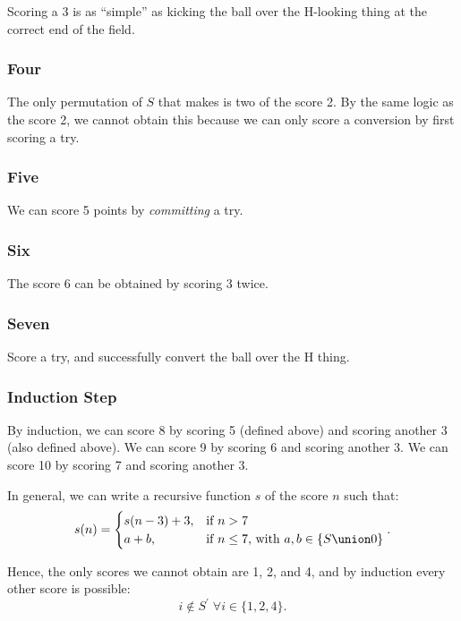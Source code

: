 \documentclass{arteacle}
\begin{document}
Scoring a 3 is as ``simple'' as kicking the ball over the H-looking thing at the correct end of the field.

\subsubsection*{Four}

The only permutation of $S$ that makes is two of the score 2.  By the same logic as the score 2, we cannot obtain this because we can only score a conversion by first scoring a try.

\subsubsection*{Five}

We can score 5 points by \emph{committing} a try.

\subsubsection*{Six}

The score 6 can be obtained by scoring 3 twice.

\subsubsection*{Seven}

Score a try, and successfully convert the ball over the H thing.

\subsubsection*{Induction Step}

By induction, we can score 8 by scoring 5 (defined above) and scoring another 3 (also defined above).  We can score 9 by scoring 6 and scoring another 3.  We can score 10 by scoring 7 and scoring another 3.  

In general, we can write a recursive function $s$ of the score $n$ such that:
\begin{equation}
	s(n) = \begin{cases}
		s(n - 3) + 3,&\text{if }n>7\\
		a+b,&\text{if }n\leq 7\text{, with }a,b\in\{S\union 0\}
	\end{cases}.
\end{equation}

Hence, the only scores we cannot obtain are 1, 2, and 4, and by induction every other score is possible:
\begin{equation}
i \notin S^\prime \;\forall i \in \{1, 2, 4\}.
\end{equation}
\end{document}
